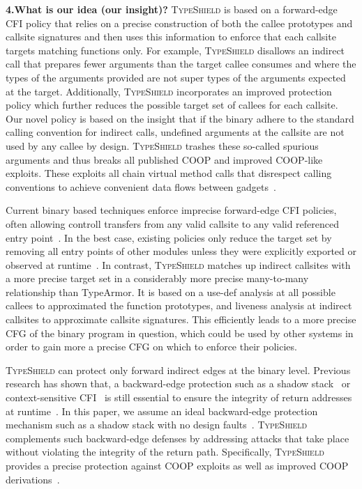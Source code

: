 \textbf{4.What is our idea (our insight)?} \textsc{TypeShield} is based on a forward-edge CFI policy that 
relies on a precise construction of both the callee prototypes and callsite signatures
and then uses this information to enforce that each callsite targets matching functions 
only. For example, \textsc{TypeShield} disallows an indirect call that prepares
fewer arguments than the target callee consumes and where the types of the 
arguments provided are not super types of the arguments expected at the target.
Additionally, \textsc{TypeShield} incorporates an improved protection policy
which further reduces the possible target set of callees for each callsite.
Our novel policy is based on the insight that if the binary adhere to the standard calling convention
for indirect calls, undefined arguments at the callsite are not used by
any callee by design. \textsc{TypeShield} trashes these so-called
spurious arguments and thus breaks all published COOP
and improved COOP-like exploits. These exploits all chain
virtual method calls that disrespect calling conventions to
achieve convenient data flows between gadgets~\cite{crane:readactor++}.

Current binary based techniques enforce imprecise forward-edge CFI 
policies, often allowing controll transfers from any valid callsite 
to any valid referenced entry point~\cite{ccfir:zhang, zhang:usenix}. 
In the best case, existing policies only reduce the target set by
removing all entry points of other modules unless they were
explicitly exported or observed at runtime~\cite{payer:dimva}. 
In contrast, \textsc{TypeShield} matches up indirect callsites with a more precise
target set in a considerably more precise many-to-many relationship than TypeArmor.
It is based on a use-def analysis at all possible callees to approximated the function prototypes, 
and liveness analysis at indirect callsites to approximate callsite signatures. This 
efficiently leads to a more precise CFG of the binary program in question, 
which could be used by other systems in order to gain more a precise CFG on which to 
enforce their policies.

\textsc{TypeShield} can protect only forward indirect edges at the binary level.
Previous research has shown that, a backward-edge protection 
such as a shadow stack~\cite{dang:asiaccs} or context-sensitive
CFI~\cite{veen:cfi} is still essential to ensure the integrity of return addresses at 
runtime~\cite{crane:readactor++}. In this paper, we assume an ideal
backward-edge protection mechanism such as a shadow
stack with no design faults~\cite{conti:ccs}. 
\textsc{TypeShield} complements such backward-edge defenses by addressing
attacks that take place without violating the integrity of the return path.
Specifically, \textsc{TypeShield} provides a precise protection 
against COOP exploits as well as improved COOP 
derivations~\cite{crane:readactor++, subversive-c:lettner, ctf:coop, loop:oriented}.

